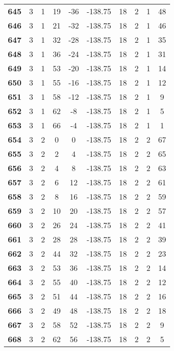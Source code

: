 \documentclass{article}%
\begin{document}
\begin{longtable}{cccccccccc}
        \textbf{645} & 3 & 1 & 19 & -36 & -138.75 & 18 & 2 & 1 & 48 \\ 
        \textbf{646} & 3 & 1 & 21 & -32 & -138.75 & 18 & 2 & 1 & 46 \\ 
        \textbf{647} & 3 & 1 & 32 & -28 & -138.75 & 18 & 2 & 1 & 35 \\ 
        \textbf{648} & 3 & 1 & 36 & -24 & -138.75 & 18 & 2 & 1 & 31 \\ 
        \textbf{649} & 3 & 1 & 53 & -20 & -138.75 & 18 & 2 & 1 & 14 \\ 
        \textbf{650} & 3 & 1 & 55 & -16 & -138.75 & 18 & 2 & 1 & 12 \\ 
        \textbf{651} & 3 & 1 & 58 & -12 & -138.75 & 18 & 2 & 1 & 9 \\ 
        \textbf{652} & 3 & 1 & 62 & -8 & -138.75 & 18 & 2 & 1 & 5 \\ 
        \textbf{653} & 3 & 1 & 66 & -4 & -138.75 & 18 & 2 & 1 & 1 \\ 
        \textbf{654} & 3 & 2 & 0 & 0 & -138.75 & 18 & 2 & 2 & 67 \\ 
        \textbf{655} & 3 & 2 & 2 & 4 & -138.75 & 18 & 2 & 2 & 65 \\ 
        \textbf{656} & 3 & 2 & 4 & 8 & -138.75 & 18 & 2 & 2 & 63 \\ 
        \textbf{657} & 3 & 2 & 6 & 12 & -138.75 & 18 & 2 & 2 & 61 \\ 
        \textbf{658} & 3 & 2 & 8 & 16 & -138.75 & 18 & 2 & 2 & 59 \\ 
        \textbf{659} & 3 & 2 & 10 & 20 & -138.75 & 18 & 2 & 2 & 57 \\ 
        \textbf{660} & 3 & 2 & 26 & 24 & -138.75 & 18 & 2 & 2 & 41 \\ 
        \textbf{661} & 3 & 2 & 28 & 28 & -138.75 & 18 & 2 & 2 & 39 \\ 
        \textbf{662} & 3 & 2 & 44 & 32 & -138.75 & 18 & 2 & 2 & 23 \\ 
        \textbf{663} & 3 & 2 & 53 & 36 & -138.75 & 18 & 2 & 2 & 14 \\ 
        \textbf{664} & 3 & 2 & 55 & 40 & -138.75 & 18 & 2 & 2 & 12 \\ 
        \textbf{665} & 3 & 2 & 51 & 44 & -138.75 & 18 & 2 & 2 & 16 \\ 
        \textbf{666} & 3 & 2 & 49 & 48 & -138.75 & 18 & 2 & 2 & 18 \\ 
        \textbf{667} & 3 & 2 & 58 & 52 & -138.75 & 18 & 2 & 2 & 9 \\ 
        \textbf{668} & 3 & 2 & 62 & 56 & -138.75 & 18 & 2 & 2 & 5 \\ 

\end{longtable}
\end{document}
